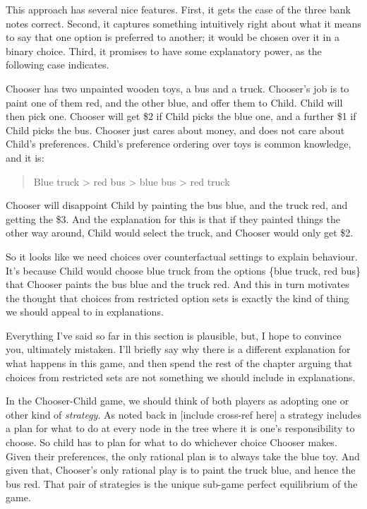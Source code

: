 \documentclass[
  12pt,
  letterpaper,
  DIV=11,
  numbers=noendperiod]{scrreprt}
\begin{document}
This approach has several nice features. First, it gets the case of the
three bank notes correct. Second, it captures something intuitively
right about what it means to say that one option is preferred to
another; it would be chosen over it in a binary choice. Third, it
promises to have some explanatory power, as the following case
indicates.

Chooser has two unpainted wooden toys, a bus and a truck. Chooser's job
is to paint one of them red, and the other blue, and offer them to
Child. Child will then pick one. Chooser will get \$2 if Child picks the
blue one, and a further \$1 if Child picks the bus. Chooser just cares
about money, and does not care about Child's preferences. Child's
preference ordering over toys is common knowledge, and it is:

\begin{quote}
Blue truck \textgreater{} red bus \textgreater{} blue bus \textgreater{}
red truck
\end{quote}

Chooser will disappoint Child by painting the bus blue, and the truck
red, and getting the \$3. And the explanation for this is that if they
painted things the other way around, Child would select the truck, and
Chooser would only get \$2.

So it looks like we need choices over counterfactual settings to explain
behaviour. It's because Child would choose blue truck from the options
\{blue truck, red bus\} that Chooser paints the bus blue and the truck
red. And this in turn motivates the thought that choices from restricted
option sets is exactly the kind of thing we should appeal to in
explanations.

Everything I've said so far in this section is plausible, but, I hope to
convince you, ultimately mistaken. I'll briefly say why there is a
different explanation for what happens in this game, and then spend the
rest of the chapter arguing that choices from restricted sets are not
something we should include in explanations.

In the Chooser-Child game, we should think of both players as adopting
one or other kind of \emph{strategy}. As noted back in {[}include
cross-ref here{]} a strategy includes a plan for what to do at every
node in the tree where it is one's responsibility to choose. So child
has to plan for what to do whichever choice Chooser makes. Given their
preferences, the only rational plan is to always take the blue toy. And
given that, Chooser's only rational play is to paint the truck blue, and
hence the bus red. That pair of strategies is the unique sub-game
perfect equilibrium of the game.
\end{document}
